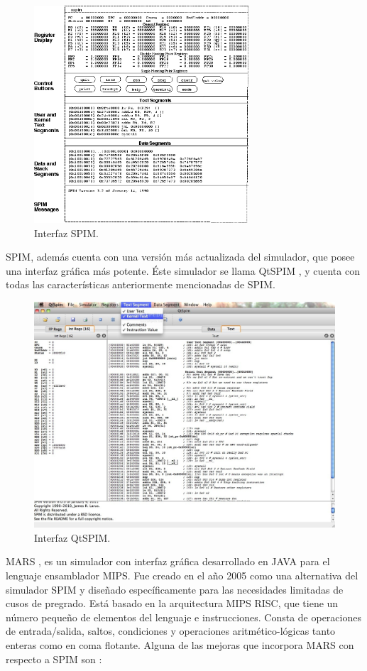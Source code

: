 \begin{figure}[htbp]
 	\centering
 	\includegraphics[width=8cm]{figures/spim_figure}
 	\caption{Interfaz SPIM.}
	\label{fig:spim_figure}
\end{figure}

SPIM, además cuenta con una versión más actualizada del simulador, que posee una interfaz gráfica más potente. Éste simulador se llama QtSPIM \cite{aguilar2013simuladores}, y cuenta con todas las características anteriormente mencionadas de SPIM.

\begin{figure}[htbp]
 	\centering
 	\includegraphics[width=12cm]{figures/qtspim_figure}
 	\caption{Interfaz QtSPIM.}
	\label{fig:qtspim_figure}
\end{figure}

MARS \cite{vollmar2006mars}, es un simulador con interfaz gráfica desarrollado en JAVA para el lenguaje ensamblador MIPS. Fue creado en el año 2005 como una alternativa del simulador SPIM y diseñado específicamente para las necesidades limitadas de cusos de pregrado. Está basado en la arquitectura MIPS RISC, que tiene un número pequeño de elementos del lenguaje e instrucciones. Consta de operaciones de entrada/salida, saltos, condiciones y operaciones aritmético-lógicas tanto enteras como en coma flotante. Alguna de las mejoras que incorpora MARS con respecto a SPIM son \cite{vegdahl2008mipspilot}: 

